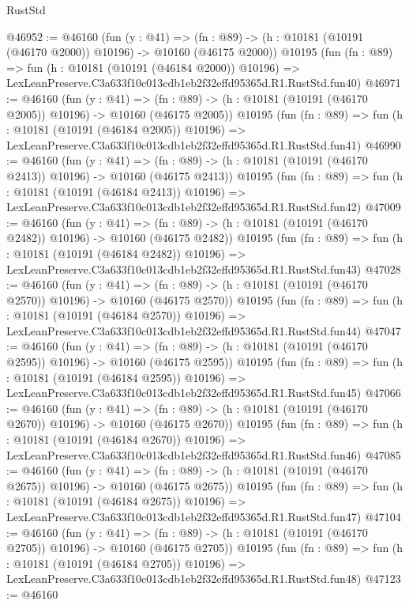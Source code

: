 \begin{lexlean}{RustStd}
\begin{coremodule}
@46952 := @46160
    (fun (y : @41) =>
    (fn : @89) -> (h : @10181 (@10191 (@46170 @2000)) @10196) -> @10160 (@46175 @2000))
    @10195
    (fun (fn : @89) =>
    fun (h : @10181 (@10191 (@46184 @2000)) @10196) =>
    LexLeanPreserve.C3a633f10c013cdb1eb2f32effd95365d.R1.RustStd.fun40)
@46971 := @46160
    (fun (y : @41) =>
    (fn : @89) -> (h : @10181 (@10191 (@46170 @2005)) @10196) -> @10160 (@46175 @2005))
    @10195
    (fun (fn : @89) =>
    fun (h : @10181 (@10191 (@46184 @2005)) @10196) =>
    LexLeanPreserve.C3a633f10c013cdb1eb2f32effd95365d.R1.RustStd.fun41)
@46990 := @46160
    (fun (y : @41) =>
    (fn : @89) -> (h : @10181 (@10191 (@46170 @2413)) @10196) -> @10160 (@46175 @2413))
    @10195
    (fun (fn : @89) =>
    fun (h : @10181 (@10191 (@46184 @2413)) @10196) =>
    LexLeanPreserve.C3a633f10c013cdb1eb2f32effd95365d.R1.RustStd.fun42)
@47009 := @46160
    (fun (y : @41) =>
    (fn : @89) -> (h : @10181 (@10191 (@46170 @2482)) @10196) -> @10160 (@46175 @2482))
    @10195
    (fun (fn : @89) =>
    fun (h : @10181 (@10191 (@46184 @2482)) @10196) =>
    LexLeanPreserve.C3a633f10c013cdb1eb2f32effd95365d.R1.RustStd.fun43)
@47028 := @46160
    (fun (y : @41) =>
    (fn : @89) -> (h : @10181 (@10191 (@46170 @2570)) @10196) -> @10160 (@46175 @2570))
    @10195
    (fun (fn : @89) =>
    fun (h : @10181 (@10191 (@46184 @2570)) @10196) =>
    LexLeanPreserve.C3a633f10c013cdb1eb2f32effd95365d.R1.RustStd.fun44)
@47047 := @46160
    (fun (y : @41) =>
    (fn : @89) -> (h : @10181 (@10191 (@46170 @2595)) @10196) -> @10160 (@46175 @2595))
    @10195
    (fun (fn : @89) =>
    fun (h : @10181 (@10191 (@46184 @2595)) @10196) =>
    LexLeanPreserve.C3a633f10c013cdb1eb2f32effd95365d.R1.RustStd.fun45)
@47066 := @46160
    (fun (y : @41) =>
    (fn : @89) -> (h : @10181 (@10191 (@46170 @2670)) @10196) -> @10160 (@46175 @2670))
    @10195
    (fun (fn : @89) =>
    fun (h : @10181 (@10191 (@46184 @2670)) @10196) =>
    LexLeanPreserve.C3a633f10c013cdb1eb2f32effd95365d.R1.RustStd.fun46)
@47085 := @46160
    (fun (y : @41) =>
    (fn : @89) -> (h : @10181 (@10191 (@46170 @2675)) @10196) -> @10160 (@46175 @2675))
    @10195
    (fun (fn : @89) =>
    fun (h : @10181 (@10191 (@46184 @2675)) @10196) =>
    LexLeanPreserve.C3a633f10c013cdb1eb2f32effd95365d.R1.RustStd.fun47)
@47104 := @46160
    (fun (y : @41) =>
    (fn : @89) -> (h : @10181 (@10191 (@46170 @2705)) @10196) -> @10160 (@46175 @2705))
    @10195
    (fun (fn : @89) =>
    fun (h : @10181 (@10191 (@46184 @2705)) @10196) =>
    LexLeanPreserve.C3a633f10c013cdb1eb2f32effd95365d.R1.RustStd.fun48)
@47123 := @46160

\end{coremodule}
\end{lexlean}
